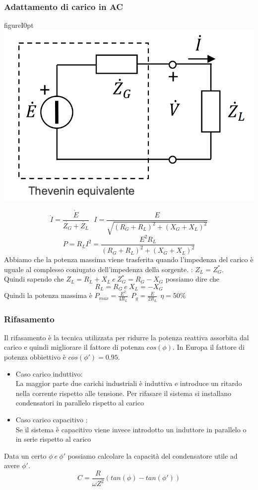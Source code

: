 \documentclass{article}
\theoremstyle{definition}
\begin{document}
\subsubsection{Adattamento di carico in  AC}
\begin{wrapfloat}{figure}{I}{0pt}
\includegraphics[scale=0.30]{immagini/AC}
\end{wrapfloat} 

$$\dot{I}=\frac{\dot{E}}{\dot{Z_G}+\dot{Z_L}} \ \ \ I=\frac{E}{\sqrt{(R_G+R_L)^2+(X_G+X_L)^2}}$$ 
$$P=R_LI^2=\frac{E^2R_L}{(R_G+R_L)^2+(X_G+X_L)^2}$$
Abbiamo che la potenza massima viene trasferita quando l'impedenza del carico è uguale al complesso coniugato dell'impedenza  della sorgente. : $Z_L=Z_G^*$.
\\Quindi sapendo che $Z_L=R_L+X_L \ e\ Z_G^*=R_G-X_G $  possiamo dire che 
$$R_L=R_G \ e \ X_L=-X_G$$
Quindi la potenza massima è $P_{max}=\frac{E^2}{4R_L} \ \ P_g=\frac{E}{2R_L} \  \  \eta=50\% $
\subsubsection{Rifasamento}
Il rifasamento è la tecnica utilizzata per ridurre la potenza reattiva assorbita dal carico e quindi migliorare il fattore di potenza $cos(\phi)$. In Europa il fattore di potenza obbiettivo è $cos(\phi')=0.95$.
\begin{itemize}
\item Caso carico induttivo:\\
La maggior parte due carichi industriali è induttiva e introduce un ritardo nella corrente rispetto alle tensione. Per rifasare il sistema si installano condensatori in parallelo rispetto al carico 
\item Caso carico capacitivo : \\
Se il sistema è capacitivo viene invece introdotto un induttore in parallelo o in serie rispetto al carico 
\end{itemize}
Data un certo $\phi \ e \ \phi'$ possiamo calcolare la capacità del condensatore utile ad avere $\phi'$.
$$C=\frac{R}{\omega Z^2}(tan(\phi)-tan(\phi'))$$
\end{document}
